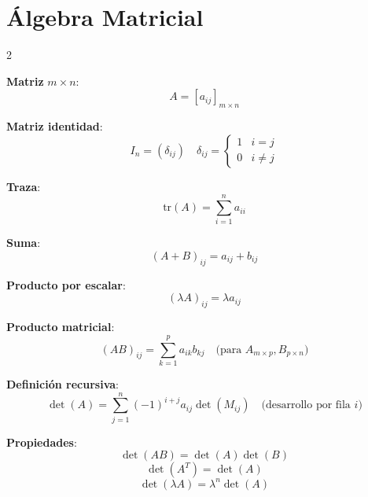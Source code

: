               \section{Álgebra Matricial}
              \begin{multicols}{2}

                \begin{itemform}[leftmargin=*]
                \item \textbf{Matriz } $m \times n$:
                  $$ A = [a_{ij}]_{m \times n} $$

                \item \textbf{Matriz identidad}:
                  $$ I_n = (\delta_{ij}) \quad \delta_{ij} =
                  \begin{cases}
                    1 & i=j \\
                    0 & i \neq j
                  \end{cases} $$

                \item \textbf{Traza}:
                  $$ \text{tr}(A) = \sum_{i=1}^n a_{ii} $$
                \end{itemform}

                \begin{itemform}[leftmargin=*]
                \item \textbf{Suma}:
                  $$ (A+B)_{ij} = a_{ij} + b_{ij} $$

                \item \textbf{Producto por escalar}:
                  $$ (\lambda A)_{ij} = \lambda a_{ij} $$

                \item \textbf{Producto matricial}:
                  $$ (AB)_{ij} = \sum_{k=1}^p a_{ik}b_{kj} \quad \text{(para } A_{m\times p}, B_{p\times n}\text{)} $$
                \end{itemform}

                \begin{itemform}[leftmargin=*]
                \item \textbf{Definición recursiva}:
                  $$ \det(A) = \sum_{j=1}^n (-1)^{i+j} a_{ij} \det(M_{ij}) \quad \text{(desarrollo por fila } i\text{)} $$

                \item \textbf{Propiedades}:
                  $$\det(AB) = \det(A)\det(B)$$
                  $$\det(A^T) = \det(A)$$
                  $$\det(\lambda A) = \lambda^n \det(A)$$
                \end{itemform}


\end{multicols}
